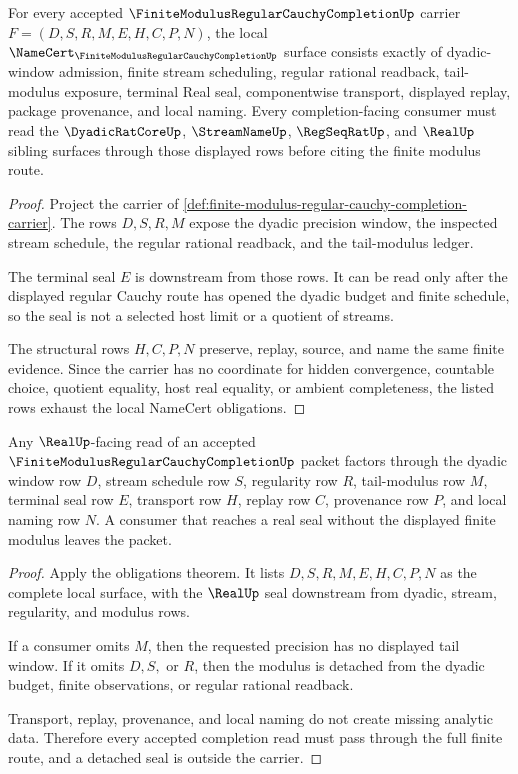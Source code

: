 \begin{theorem}
\label{thm:finite-modulus-regular-cauchy-completion-obligations}
For every accepted $\FiniteModulusRegularCauchyCompletionUp$ carrier $F=(D,S,R,M,E,H,C,P,N)$, the local $\NameCert_{\FiniteModulusRegularCauchyCompletionUp}$ surface consists exactly of dyadic-window admission, finite stream scheduling, regular rational readback, tail-modulus exposure, terminal Real seal, componentwise transport, displayed replay, package provenance, and local naming. Every completion-facing consumer must read the $\DyadicRatCoreUp$, $\StreamNameUp$, $\RegSeqRatUp$, and $\RealUp$ sibling surfaces through those displayed rows before citing the finite modulus route.
\end{theorem}
\begin{proof}
Project the carrier of \autoref{def:finite-modulus-regular-cauchy-completion-carrier}. The rows $D,S,R,M$ expose the dyadic precision window, the inspected stream schedule, the regular rational readback, and the tail-modulus ledger.

The terminal seal $E$ is downstream from those rows. It can be read only after the displayed regular Cauchy route has opened the dyadic budget and finite schedule, so the seal is not a selected host limit or a quotient of streams.

The structural rows $H,C,P,N$ preserve, replay, source, and name the same finite evidence. Since the carrier has no coordinate for hidden convergence, countable choice, quotient equality, host real equality, or ambient completeness, the listed rows exhaust the local NameCert obligations.
\end{proof}

\begin{theorem}
\label{thm:finite-modulus-regular-cauchy-completion-route-boundary}
Any $\RealUp$-facing read of an accepted $\FiniteModulusRegularCauchyCompletionUp$ packet factors through the dyadic window row $D$, stream schedule row $S$, regularity row $R$, tail-modulus row $M$, terminal seal row $E$, transport row $H$, replay row $C$, provenance row $P$, and local naming row $N$. A consumer that reaches a real seal without the displayed finite modulus leaves the packet.
\end{theorem}
\begin{proof}
Apply the obligations theorem. It lists $D,S,R,M,E,H,C,P,N$ as the complete local surface, with the $\RealUp$ seal downstream from dyadic, stream, regularity, and modulus rows.

If a consumer omits $M$, then the requested precision has no displayed tail window. If it omits $D,S,$ or $R$, then the modulus is detached from the dyadic budget, finite observations, or regular rational readback.

Transport, replay, provenance, and local naming do not create missing analytic data. Therefore every accepted completion read must pass through the full finite route, and a detached seal is outside the carrier.
\end{proof}

